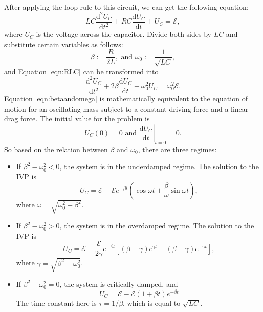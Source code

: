 \documentclass{my_template}
\newcommand{\e}{\mathcal{E}}
\begin{document}
    \paragraph{} After applying the loop rule to this circuit, we can get the following equation: 
    \begin{equation}
        LC\frac{\mathrm{d}^2U_C}{\mathrm{d}t^2}+RC\frac{\mathrm{d}U_C}{\mathrm{d}t}+U_C=\e, \label{eqn:RLC}
    \end{equation}
    where $U_C$ is the voltage across the capacitor. Divide both sides by $LC$ and substitute certain variables as follows: \[\beta:=\frac{R}{2L},\text{ and } \omega_0:=\frac{1}{\sqrt{LC}},\] and Equation \ref{eqn:RLC} can be transformed into 
    \begin{equation}
        \frac{\mathrm{d}^2U_C}{\mathrm{d}t^2}+2\beta\frac{\mathrm{d}U_C}{\mathrm{d}t}+\omega_0^2U_C=\omega_0^2\e.
        \label{eqn:betaandomega}
    \end{equation}
    Equation \ref{eqn:betaandomega} is mathematically equivalent to the equation of motion for an oscillating mass subject to a constant driving force and a linear drag force. The initial value for the problem is \[U_C(0)=0 \text{ and } \left.\frac{\mathrm{d}U_C}{\mathrm{d}t}\right|_{t=0}=0.\] So based on the relation between $\beta$ and $\omega_0$, there are three regimes:
    \begin{itemize}
        \item If $\beta^2-\omega_0^2<0$, the system is in the underdamped regime. The solution to the IVP is 
        \begin{equation}
            U_C=\e-\e e^{-\beta t}\left(\cos \omega t+\frac{\beta}{\omega}\sin \omega t\right),\label{eqn:under}
        \end{equation}where $\omega=\sqrt{\omega_0^2-\beta^2}$.
        \item If $\beta^2-\omega_0^2>0$, the system is in the overdamped regime. The solution to the IVP is 
        \begin{equation}
            U_C=\e-\frac{\e}{2\gamma}e^{-\beta t}[(\beta+\gamma)e^{\gamma t}-(\beta-\gamma)e^{-\gamma t}],\label{eqn:over}
        \end{equation} where $\gamma=\sqrt{\beta^2-\omega_0^2}$.
        \item If $\beta^2-\omega_0^2=0$, the system is critically damped, and 
        \begin{equation}
            U_C=\e-\e (1+\beta t)e^{-\beta t}\label{eqn:criticallydamped}
        \end{equation}
        The time constant here is $\tau=1/\beta$, which is equal to $\sqrt{LC}$.
    \end{itemize}
\end{document}

